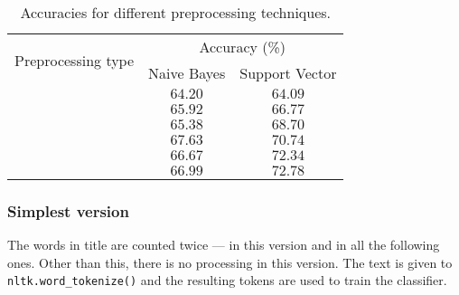 \begin{table}[ht]
    \centering
    \caption{Accuracies for different preprocessing techniques.}
    \label{tab:bayes_table}
    \vspace{1em}
    \begin{tabular}[htpb]{c|c|c}
        \multirow{2}{*}{Preprocessing type} & \multicolumn{2}{c}{Accuracy (\%)} \\
        \cline{2-3}
                                            &
        Naive Bayes
                                            & Support Vector                    \\
        \hline\hline
        \nameref{sec:bayes_simple}
                                            & $64.20$
                                            & $64.09$                           \\
        \hline
        \nameref{sec:bayes_lowercase}
                                            & $65.92$
                                            & $66.77$                           \\
        \hline
        \nameref{sec:bayes_punctuation}
                                            & $65.38$
                                            & $68.70$                           \\
        \hline
        \nameref{sec:bayes_stopwords}
                                            & $67.63$
                                            & $70.74$                           \\
        \hline
        \nameref{sec:bayes_stemming}        & $66.67$
                                            & $72.34$                           \\
        \hline
        \nameref{sec:bayes_shortwords}      & $66.99$
                                            & $72.78$                           \\
    \end{tabular}
\end{table}

\subsubsection{Simplest version}
\label{sec:bayes_simple}

The words in title are counted twice --- in this version and in all the following ones. Other than this, there is no processing in this version. The text is given to \texttt{nltk.word_tokenize()} and the resulting tokens are used to train the classifier.

